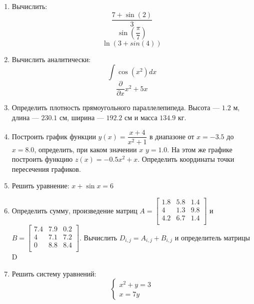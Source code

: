 \begin{enumerate}
\item Вычислить: 
\begin{equation*}\dfrac{7+\sin(2)}{3}              \end{equation*}
\begin{equation*}\sin \left( \dfrac{\pi}{7} \right)\end{equation*}
\begin{equation*}\ln(3+sin(4))                     \end{equation*}

\item Вычислить аналитически: 
 \begin{equation*} \int \cos(x^2) dx          \end{equation*}\begin{equation*} {\dfrac{\partial} {\partial x}x^2 +5 x}             \end{equation*}


\item Определить плотность прямоугольного параллелепипеда. Высота --- $1.2$ м, длина --- $230.1$ см, ширина --- $192.2$ см и масса $134.9$ кг.

\item Построить график функции $y(x)=\dfrac{x+4}{x^2+1}    $ в диапазоне от $x=-3.5$ до $x=8.0$, определить, при каком значении $x$ $y=1.0$. На этом же графике построить функцию $z(x)=-0.5 x^2 + x              $. Определить координаты точки пересечения графиков. \item Решить уравнение: $x+\sin{x}=6          $

\item Определить сумму, произведение матриц $A=\begin{bmatrix}
1.8 &5.8 &1.4 \\
4 &1.3 &9.8 \\
4.2 &6.7 &1.4 \\
\end{bmatrix}
$ и $B=\begin{bmatrix}
7.4 &7.9 &0.2 \\
4 &7.1 &7.2 \\
0 &8.8 &8.4 \\
\end{bmatrix}
$. Вычислить $D_{i,j}=A_{i,j}  +  B_{i,j}$ и определитель матрицы D

\item Решить систему уравнений: \begin{equation*} \begin{cases} x^2+y=3              \\ x=7y                      \end{cases} \end{equation*} 

\end{enumerate}
\newpage
